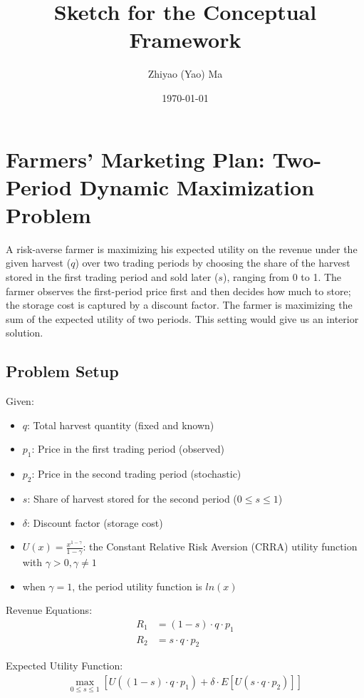 \documentclass[12pt]{article}
\title{Sketch for the Conceptual Framework}
\author[1]{Zhiyao (Yao) Ma}
\affil[1]{UC Davis}
\date{\today}
\begin{document}
\maketitle
\tableofcontents
\newpage


\section{Farmers' Marketing Plan: Two-Period Dynamic Maximization Problem}

A risk-averse farmer is maximizing his expected utility on the revenue under the given harvest ($q$) over two trading periods by choosing the share of the harvest stored in the first trading period and sold later ($s$), ranging from 0 to 1. The farmer observes the first-period price first and then decides how much to store; the storage cost is captured by a discount factor. The farmer is maximizing the sum of the expected utility of two periods. This setting would give us an interior solution.

\subsection{Problem Setup}

Given:
\begin{itemize}
    \item $q$: Total harvest quantity (fixed and known)
    \item $p_1$: Price in the first trading period (observed)
    \item $p_2$: Price in the second trading period (stochastic)
    \item $s$: Share of harvest stored for the second period ($0 \leq s \leq 1$)
    \item $\delta$: Discount factor (storage cost)
    \item $U(x) = \frac{x^{1 - \gamma}}{1 - \gamma}$: the Constant Relative Risk Aversion (CRRA) utility function with $\gamma > 0, \gamma \neq 1$
    \item when $\gamma=1$, the period utility function is $ln(x)$
\end{itemize}

Revenue Equations:
\begin{align*}
    R_1 &= \left(1 - s\right) \cdot q \cdot p_1 \\
    R_2 &= s \cdot q \cdot p_2
\end{align*}

Expected Utility Function:
\begin{align}
    \max_{0 \leq s \leq 1} \left[ U(\left(1 - s\right) \cdot q \cdot p_1) + \delta \cdot E\left[U(s \cdot q \cdot p_2)\right] \right]
\end{align}
\end{document}
